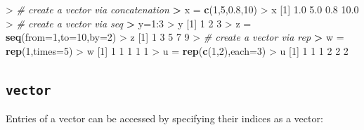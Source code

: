 \documentclass[]{article}
\newenvironment{Shaded}{\begin{snugshade}}{\end{snugshade}}
\newcommand{\KeywordTok}[1]{\textcolor[rgb]{0.13,0.29,0.53}{\textbf{{#1}}}}
\newcommand{\DataTypeTok}[1]{\textcolor[rgb]{0.13,0.29,0.53}{{#1}}}
\newcommand{\DecValTok}[1]{\textcolor[rgb]{0.00,0.00,0.81}{{#1}}}
\newcommand{\FloatTok}[1]{\textcolor[rgb]{0.00,0.00,0.81}{{#1}}}
\newcommand{\StringTok}[1]{\textcolor[rgb]{0.31,0.60,0.02}{{#1}}}
\newcommand{\CommentTok}[1]{\textcolor[rgb]{0.56,0.35,0.01}{\textit{{#1}}}}
\newcommand{\ErrorTok}[1]{\textcolor[rgb]{0.64,0.00,0.00}{\textbf{{#1}}}}
\newcommand{\NormalTok}[1]{{#1}}
\begin{document}
\begin{Shaded}
\begin{Highlighting}[]
\NormalTok{>}\StringTok{ }\CommentTok{# create a vector via concatenation}
\ErrorTok{>}\StringTok{ }\NormalTok{x =}\StringTok{ }\KeywordTok{c}\NormalTok{(}\DecValTok{1}\NormalTok{,}\DecValTok{5}\NormalTok{,}\FloatTok{0.8}\NormalTok{,}\DecValTok{10}\NormalTok{)}
\NormalTok{>}\StringTok{ }\NormalTok{x}
\NormalTok{[}\DecValTok{1}\NormalTok{]  }\FloatTok{1.0}  \FloatTok{5.0}  \FloatTok{0.8} \FloatTok{10.0}
\NormalTok{>}\StringTok{ }\CommentTok{# create a vector via seq}
\ErrorTok{>}\StringTok{ }\NormalTok{y=}\DecValTok{1}\NormalTok{:}\DecValTok{3}
\NormalTok{>}\StringTok{ }\NormalTok{y}
\NormalTok{[}\DecValTok{1}\NormalTok{] }\DecValTok{1} \DecValTok{2} \DecValTok{3}
\NormalTok{>}\StringTok{ }\NormalTok{z =}\StringTok{ }\KeywordTok{seq}\NormalTok{(}\DataTypeTok{from=}\DecValTok{1}\NormalTok{,}\DataTypeTok{to=}\DecValTok{10}\NormalTok{,}\DataTypeTok{by=}\DecValTok{2}\NormalTok{)}
\NormalTok{>}\StringTok{ }\NormalTok{z}
\NormalTok{[}\DecValTok{1}\NormalTok{] }\DecValTok{1} \DecValTok{3} \DecValTok{5} \DecValTok{7} \DecValTok{9}
\NormalTok{>}\StringTok{ }\CommentTok{# create a vector via rep}
\ErrorTok{>}\StringTok{ }\NormalTok{w =}\StringTok{ }\KeywordTok{rep}\NormalTok{(}\DecValTok{1}\NormalTok{,}\DataTypeTok{times=}\DecValTok{5}\NormalTok{)}
\NormalTok{>}\StringTok{ }\NormalTok{w}
\NormalTok{[}\DecValTok{1}\NormalTok{] }\DecValTok{1} \DecValTok{1} \DecValTok{1} \DecValTok{1} \DecValTok{1}
\NormalTok{>}\StringTok{ }\NormalTok{u =}\StringTok{ }\KeywordTok{rep}\NormalTok{(}\KeywordTok{c}\NormalTok{(}\DecValTok{1}\NormalTok{,}\DecValTok{2}\NormalTok{),}\DataTypeTok{each=}\DecValTok{3}\NormalTok{)}
\NormalTok{>}\StringTok{ }\NormalTok{u}
\NormalTok{[}\DecValTok{1}\NormalTok{] }\DecValTok{1} \DecValTok{1} \DecValTok{1} \DecValTok{2} \DecValTok{2} \DecValTok{2}
\end{Highlighting}
\end{Shaded}

\subsection{\texorpdfstring{\texttt{vector}}{vector}}\label{vector-1}

Entries of a vector can be accessed by specifying their indices as a
vector:
\end{document}
